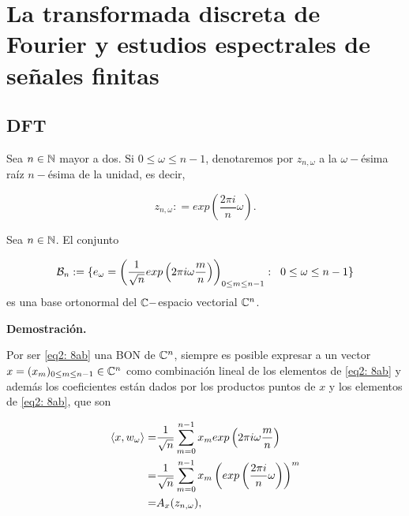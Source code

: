 \section{La transformada discreta de Fourier y estudios espectrales de señales finitas}


\subsection{DFT}

\begin{notacion}
Sea $n \in \mathbb{N}$ mayor a dos.
Si $0 \leq \omega \leq n-1$, denotaremos por $z_{n, \omega}$
a la $\omega-$ésima raíz $n-$ésima de la unidad, es decir, 

	\begin{equation}
	\label{eq3: 8ab}
	z_{n, \omega} : = exp \left( \frac{2 \pi i }{n} \omega
	\right).
	\end{equation}

\end{notacion}


\begin{prop}
Sea $n \in \mathbb{N}$. El conjunto

\begin{equation}
\label{eq2: 8ab}
\mathcal{B}_{n} : = \{
e_{\omega} = \left(
\frac{1}{\sqrt{n}} exp \left(
2 \pi i \omega \frac{m}{n}
\right)
\right)_{0 \leq m \leq n-1}
: \hspace{0.2cm} 0 \leq \omega \leq n-1
 \}
\end{equation}
es una base ortonormal del $\mathbb{C}-$espacio
vectorial $\mathbb{C}^{n}$.
\end{prop}

\noindent
\textbf{Demostración.}

\QEDB
\vspace{0.2cm}

Por ser \eqref{eq2: 8ab} una BON de $\mathbb{C}^{n}$, siempre es
posible expresar a un vector $x = (x_{m})_{0 \leq m \leq n-1} \in \mathbb{C}^{n}$
como combinación lineal de los elementos de \eqref{eq2: 8ab}
y además los coeficientes están dados por los productos puntos
de $x$ y los elementos de \eqref{eq2: 8ab}, que son

\begin{align*}
\langle x, w_{\omega} \rangle = & 
\frac{1}{\sqrt{n}} \sum\limits_{m=0}^{n-1}x_{m} exp \left(
2 \pi i \omega \frac{m}{n}
\right) \\
= & 
\frac{1}{\sqrt{n}} \sum\limits_{m=0}^{n-1}x_{m} 
\left(
exp \left( \frac{2 \pi i }{n} \omega
\right) \right)^{m} \\
= & A_{x}(z_{n, \omega}),
\end{align*}


